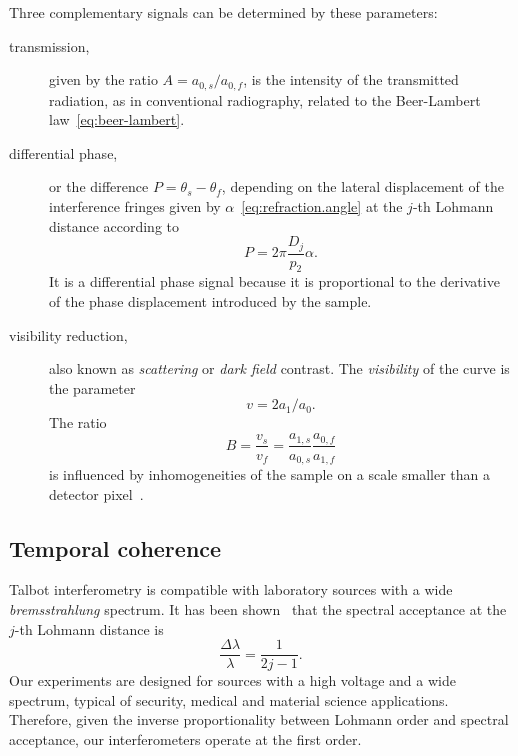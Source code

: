 Three complementary signals can be determined by these parameters:
\begin{description}
    \item[transmission,] given by the ratio $A = a_{0,s} / a_{0,f}$, is the
        intensity of the transmitted radiation, as in conventional
        radiography, related to the Beer-Lambert
        law~\eqref{eq:beer-lambert}.
    \item[differential phase,] or the difference $P = \theta_{s} -
        \theta_f$, depending on the lateral displacement of the interference
        fringes given by
        $\alpha$~\eqref{eq:refraction.angle} at the
        $j$-th Lohmann distance according to
        \begin{equation}
            P = 2\pi \frac{D_j}{p_2}\alpha.\label{eq:differential.phase}
        \end{equation}
        It is a differential phase signal because it is proportional to the
        derivative of the phase displacement introduced by the sample.
    \item[visibility reduction,] also known as 
        \emph{scattering} or \emph{dark field} contrast. The
        \emph{visibility} of the curve is the parameter
        \begin{equation}
            v = 2a_1 / a_0.
            \label{eq:visibility-definition}
        \end{equation}
        The ratio
        \begin{equation}
            B = \frac{v_s}{v_f} =
            \frac{a_{1,s}}{a_{0,s}}\frac{a_{0,f}}{a_{1,f}}
            \label{eq:dark-field-definition}
        \end{equation}
        is influenced by inhomogeneities of the sample on a scale smaller
        than a detector pixel~\parencite{Yashiro:10}.
\end{description}

\subsection{Temporal coherence}\label{sec:temporal-coherence}
Talbot interferometry is compatible with laboratory sources with a wide
\emph{bremsstrahlung} spectrum. It has been shown~\parencite{Weitkamp2005} that the spectral
acceptance at the $j$-th Lohmann distance is
\begin{equation}
    \frac{\Delta \lambda}{\lambda} = \frac{1}{2j - 1}.\label{eq:acceptance}
\end{equation}
Our experiments are designed for sources with a high voltage and a wide
spectrum, typical of security, medical and material science applications.
Therefore, given the inverse proportionality between Lohmann order
and spectral acceptance, our interferometers operate at the first order.

